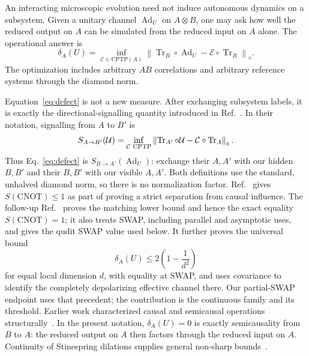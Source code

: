 \documentclass[11pt,a4paper]{article}
\theoremstyle{remark}
\newcommand{\Tr}{\operatorname{Tr}}
\newcommand{\Ad}{\operatorname{Ad}}
\newcommand{\cE}{\mathcal{E}}
\newcommand{\cU}{\mathcal{U}}
\newcommand{\diamondnorm}[1]{\left\lVert #1\right\rVert_{\diamond}}
\begin{document}
An interacting microscopic evolution need not induce autonomous dynamics on
a subsystem.  Given a unitary channel $\Ad_U$ on $A\otimes B$, one may ask how
well the reduced output on $A$ can be simulated from the reduced input on $A$
alone.  The operational answer is
\begin{equation}
 \delta_A(U)
 =\inf_{\cE\in\mathrm{CPTP}(A)}
   \diamondnorm{\Tr_B\circ\Ad_U-\cE\circ\Tr_B}.
 \label{eq:defect}
\end{equation}
The optimization includes arbitrary $AB$ correlations and arbitrary reference
systems through the diamond norm.

Equation~\eqref{eq:defect} is not a new measure.  After exchanging subsystem
labels, it is exactly the directional-signalling quantity introduced in
Ref.~\cite{barsse2024}.  In their notation, signalling from $A$ to $B'$ is
\[
 S_{A\to B'}(\cU)
 =\inf_{\mathcal C\ {\rm CPTP}}
 \diamondnorm{\Tr_{A'}\circ\cU-\mathcal C\circ\Tr_A}.
\]
Thus Eq.~\eqref{eq:defect} is $S_{B\to A'}(\Ad_U)$: exchange their
$A,A'$ with our hidden $B,B'$ and their $B,B'$ with our visible $A,A'$.
Both definitions use the standard, unhalved diamond norm, so there is no
normalization factor.  Ref.~\cite{barsse2024} gives
$S(\mathrm{CNOT})\leq1$ as part of proving a strict separation from causal
influence.  The follow-up Ref.~\cite{barsse2025} proves the matching lower
bound and hence the exact equality $S(\mathrm{CNOT})=1$; it also treats SWAP,
including parallel and asymptotic uses, and gives the qudit SWAP value used
below.  It further proves the universal bound
\begin{equation}
 \delta_A(U)\leq2\left(1-\frac1{d^2}\right)
 \label{eq:universal-swap-bound}
\end{equation}
for equal local dimension $d$, with equality at SWAP, and uses covariance to
identify the completely depolarizing effective channel there.  Our
partial-SWAP endpoint uses that precedent; the contribution is the continuous
family and its threshold.  Earlier work characterized causal and semicausal
operations structurally~\cite{beckman2001,eggeling2002}.  In the present
notation, $\delta_A(U)=0$ is exactly semicausality from $B$ to $A$: the
reduced output on $A$ then factors through the reduced input on $A$.
Continuity of Stinespring dilations supplies general non-sharp
bounds~\cite{ksw2008}.
\end{document}

